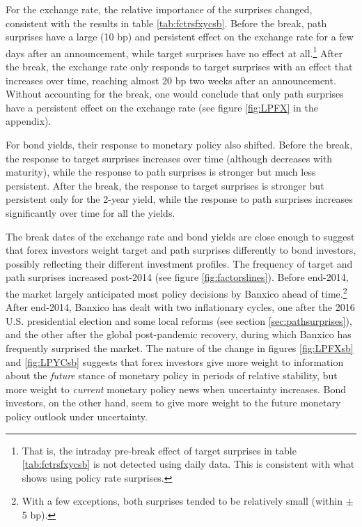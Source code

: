 \documentclass[a4paper, 12pt]{article}
\begin{document}
{\begin{landscape}
\begin{figure}[tbph]
\begin{center}
\begin{minipage}{\linewidth}
				\end{minipage} 
			\end{center}
		\end{figure}
	\end{landscape}
}

For the exchange rate, the relative importance of the surprises changed, consistent with the results in table \ref{tab:fctrsfxycsb}. 
Before the break, path surprises have a large (10 bp) and persistent effect on the exchange rate for a few days after an announcement, while target surprises have no effect at all.\footnote{That is, the intraday pre-break effect of target surprises in table \ref{tab:fctrsfxycsb} is not detected using daily data. This is consistent with what \textcite{Solis:FX} shows using policy rate surprises.} After the break, the exchange rate only responds to target surprises with an effect that increases over time, reaching almost 20 bp two weeks after an announcement. Without accounting for the break, one would conclude that only path surprises have a persistent effect on the exchange rate (see figure \ref{fig:LPFX} in the appendix).

For bond yields, their response to monetary policy also shifted. 
Before the break, the response to target surprises increases over time (although decreases with maturity), while the response to path surprises is stronger but much less persistent. 
After the break, the response to target surprises is stronger but persistent only for the 2-year yield, while the response to path surprises increases significantly over time for all the yields. 

The break dates of the exchange rate and bond yields are close enough to suggest that forex investors weight target and path surprises differently to bond investors, possibly reflecting their different investment profiles. The frequency of target and path surprises increased post-2014 (see figure \ref{fig:factorslines}).
Before end-2014, the market largely anticipated most policy decisions by Banxico ahead of time.\footnote{With a few exceptions, both surprises tended to be relatively small (within \(\pm\) 5 bp).} 
After end-2014, Banxico has dealt with two inflationary cycles, one after the 2016 U.S. presidential election and some local reforms (see section \ref{sec:pathsurprises}), and the other after the global post-pandemic recovery, during which Banxico has frequently surprised the market.
The nature of the change in figures \ref{fig:LPFXsb} and \ref{fig:LPYCsb} suggests that forex investors give more weight to information about the \textit{future} stance of monetary policy in periods of relative stability, but more weight to \textit{current} monetary policy news when uncertainty increases. Bond investors, on the other hand, seem to give more weight to the future monetary policy outlook under uncertainty. 
\end{document}
